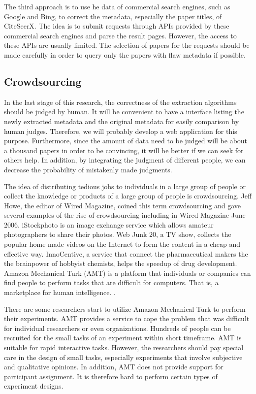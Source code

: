 \documentclass[prodmode]{acmsmall} %
\begin{document}
The third approach is to use he data of commercial search engines, such as Google and Bing, to correct the metadata, especially the paper titles, of CiteSeerX. The idea is to submit requests through APIs provided by these commercial search engines and parse the result pages. However, the access to these APIs are usually limited. The selection of papers for the requests should be made carefully in order to query only the papers with flaw metadata if possible. \cite{ororbiaciteseerx}

\subsection{Crowdsourcing}

In the last stage of this research, the correctness of the extraction algorithms should be judged by human. It will be convenient to have a interface listing the newly extracted metadata and the original metadata for easily comparison by human judges. Therefore, we will probably develop a web application for this purpose. Furthermore, since the amount of data need to be judged will be about a thousand papers in order to be convincing, it will be better if we can seek for others help. In addition, by integrating the judgment of different people, we can decrease the probability of mistakenly made judgments.

The idea of distributing tedious jobs to individuals in a large group of people or collect the knowledge or products of a large group of people is crowdsourcing. Jeff Howe, the editor of Wired Magazine, coined this term crowdsourcing and gave several examples of the rise of crowdsourcing including in Wired Magazine June 2006. iStockphoto is an image exchange service which allows amateur photographers to share their photos. Web Junk 20, a TV show, collects the popular home-made videos on the Internet to form the content in a cheap and effective way. InnoCentive, a service that connect the pharmaceutical makers the the brainpower of hobbyist chemists, helps the speedup of drug development. Amazon Mechanical Turk (AMT) is a platform that individuals or companies can find people to perform tasks that are difficult for computers. That is, a marketplace for human intelligence. \cite{howe2006rise}.

There are some researchers start to utilize Amazon Mechanical Turk to perform their experiments. AMT provides a service to cope the problem that was difficult for individual researchers or even organizations. Hundreds of people can be recruited for the small tasks of an experiment within short timeframe. AMT is suitable for rapid interactive tasks. However, the researchers should pay special care in the design of small tasks, especially experiments that involve subjective and qualitative opinions. In addition, AMT does not provide support for participant assignment. It is therefore hard to perform certain types of experiment designs. \cite{kittur2008crowdsourcing}
\end{document}
